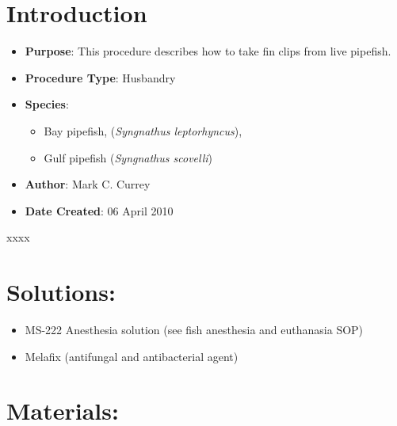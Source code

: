\documentclass[
  letterpaper,
  DIV=11,
  numbers=noendperiod]{scrreprt}
\providecommand{\tightlist}{%
  \setlength{\itemsep}{0pt}\setlength{\parskip}{0pt}}\usepackage{longtable,booktabs,array}
\begin{document}
\hypertarget{introduction-65}{%
\section{Introduction}\label{introduction-65}}

\begin{itemize}
\tightlist
\item
  \textbf{Purpose}: This procedure describes how to take fin clips from
  live pipefish.
\item
  \textbf{Procedure Type}: Husbandry
\item
  \textbf{Species}:

  \begin{itemize}
  \tightlist
  \item
    Bay pipefish, (\emph{Syngnathus leptorhyncus}),
  \item
    Gulf pipefish (\emph{Syngnathus scovelli})
  \end{itemize}
\item
  \textbf{Author}: Mark C. Currey
\item
  \textbf{Date Created}: 06 April 2010
\end{itemize}

\begin{tcolorbox}[enhanced jigsaw, rightrule=.15mm, title=\textcolor{quarto-callout-warning-color}{\faExclamationTriangle}\hspace{0.5em}{xxxx}, titlerule=0mm, opacitybacktitle=0.6, toprule=.15mm, bottomrule=.15mm, opacityback=0, left=2mm, colframe=quarto-callout-warning-color-frame, breakable, coltitle=black, colback=white, colbacktitle=quarto-callout-warning-color!10!white, bottomtitle=1mm, leftrule=.75mm, toptitle=1mm, arc=.35mm]

xxxx

\end{tcolorbox}

\hypertarget{solutions-53}{%
\section{Solutions:}\label{solutions-53}}

\begin{itemize}
\tightlist
\item
  MS-222 Anesthesia solution (see fish anesthesia and euthanasia SOP)
\item
  Melafix (antifungal and antibacterial agent)
\end{itemize}

\hypertarget{materials-62}{%
\section{Materials:}\label{materials-62}}
\end{document}

